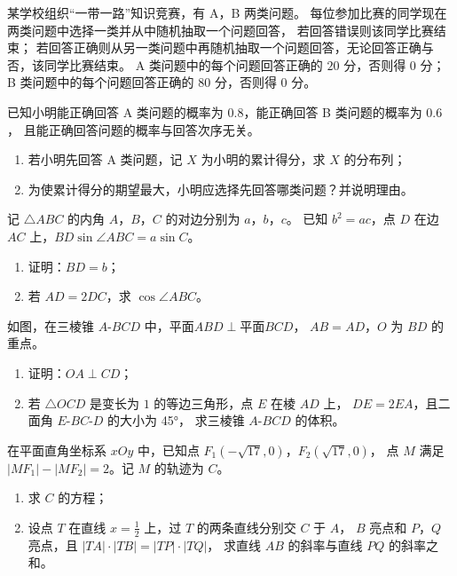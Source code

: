 \documentclass[zihao = -4]{exam-zh}
\begin{document}
\begin{problem}[points = 12]
  某学校组织“一带一路”知识竞赛，有 A，B 两类问题。
  每位参加比赛的同学现在两类问题中选择一类并从中随机抽取一个问题回答，
  若回答错误则该同学比赛结束；
  若回答正确则从另一类问题中再随机抽取一个问题回答，无论回答正确与否，该同学比赛结束。
  A 类问题中的每个问题回答正确的 $20$ 分，否则得 $0$ 分；
  B 类问题中的每个问题回答正确的 $80$ 分，否则得 $0$ 分。

  已知小明能正确回答 A 类问题的概率为 $0.8$，能正确回答 B 类问题的概率为 $0.6$，
  且能正确回答问题的概率与回答次序无关。
  \begin{enumerate}
    \item 若小明先回答 A 类问题，记 $X$ 为小明的累计得分，求 $X$ 的分布列；
    \item 为使累计得分的期望最大，小明应选择先回答哪类问题？并说明理由。
  \end{enumerate}
\end{problem}

\begin{problem}[points = 12]
  记 $\triangle ABC$ 的内角 $A$，$B$，$C$ 的对边分别为 $a$，$b$，$c$。
  已知 $b^2 = ac$，点 $D$ 在边 $AC$ 上，$BD \sin\angle ABC = a \sin C$。
  \nopagebreak
  \begin{enumerate}
    \item 证明：$BD = b$；
    \item 若 $AD = 2 DC$，求 $\cos\angle ABC$。
  \end{enumerate}
\end{problem}

\begin{problem}[points = 12]
  如图，在三棱锥 $A$-$BCD$ 中，$\text{平面} ABD \perp \text{平面} BCD$，
  $AB = AD$，$O$ 为 $BD$ 的重点。
  \begin{enumerate}
    \item 证明：$OA \perp CD$；
    \item 若 $\triangle OCD$ 是变长为 $1$ 的等边三角形，点 $E$ 在棱 $AD$ 上，
      $DE = 2 EA$，且二面角 $E$-$BC$-$D$ 的大小为 \ang{45}，
      求三棱锥 $A$-$BCD$ 的体积。
  \end{enumerate}
\end{problem}

\begin{problem}[points = 12]
  在平面直角坐标系 $xOy$ 中，已知点 $F_1 (-\sqrt{17}, 0)$，$F_2 (\sqrt{17}, 0)$，
  点 $M$ 满足 $|M F_1| - |M F_2| = 2$。记 $M$ 的轨迹为 $C$。
  \begin{enumerate}
    \item 求 $C$ 的方程；
    \item 设点 $T$ 在直线 $x = \frac{1}{2}$ 上，过 $T$ 的两条直线分别交 $C$ 于 $A$，
      $B$ 亮点和 $P$，$Q$ 亮点，且 $|TA| \cdot |TB| = |TP| \cdot |TQ|$，
      求直线 $AB$ 的斜率与直线 $PQ$ 的斜率之和。
  \end{enumerate}
\end{problem}
\end{document}
